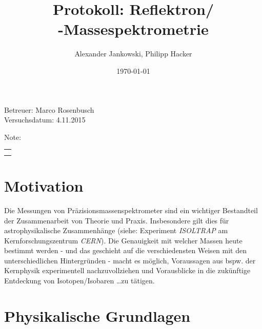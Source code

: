 \documentclass[numbers=noenddot,a4paper,notitlepage,twoside,BCOR15mm]{scrartcl}
\title{Protokoll: Reflektron/\\\tilt{time of flight}-Massespektrometrie} %
\author{Alexander Jankowski, Philipp Hacker}
\date{\today}
\newcommand{\tilt}[1]{\textit{#1}}
\begin{document}
	\maketitle
	\begin{center}
		Betreuer: Marco Rosenbusch \\ %
		Versuchsdatum: 4.11.2015 \\ %
		\begin{table}[h]
			\centering
			Note: %
			\begin{tabularx}{1.5cm}{|X|}
				\hline \\ \\
				\hline
			\end{tabularx}
		\end{table}
	\end{center}
	\vspace*{\fill}
	\tableofcontents
	\vfill
	\clearpage
	\section{Motivation}

		Die Messungen von Präzisionsmassenspektrometer sind ein wichtiger Bestandteil der Zusammenarbeit von Theorie und Praxis. Insbesondere gilt dies für astrophysikalische Zusammenhänge (siehe: Experiment \tilt{ISOLTRAP} am Kernforschungszentrum \tilt{CERN}). Die Genauigkeit mit welcher Massen heute bestimmt werden - und das geschieht auf die verschiedensten Weisen mit den unterschiedlichen Hintergründen - macht es möglich, Voraussagen aus bspw. der Kernphysik experimentell nachzuvollziehen und Vorausblicke in die zukünftige Entdeckung von Isotopen/Isobaren \dots zu tätigen.

	\clearpage
	\section{Physikalische Grundlagen}
\end{document}
